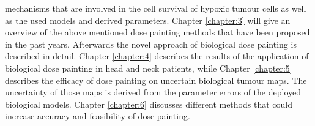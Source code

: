 mechanisms that are involved in the cell survival of hypoxic tumour cells as well as the used models and derived parameters. Chapter \ref{chapter:3} will give an overview of the above mentioned dose painting methods that have been proposed in the past years. Afterwards the novel approach of biological dose painting is described in detail. Chapter \ref{chapter:4} describes the results of the application of biological dose painting in head and neck patients, while Chapter \ref{chapter:5} describes the efficacy of dose painting on uncertain biological tumour maps. The uncertainty of those maps is derived from the parameter errors of the deployed biological models. Chapter \ref{chapter:6} discusses different methods that could increase accuracy and feasibility of dose painting.